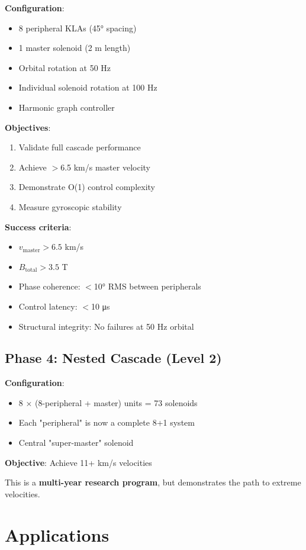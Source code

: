 \documentclass[12pt,a4paper]{article}
\begin{document}
\textbf{Configuration}:
\begin{itemize}
\item 8 peripheral KLAs (45° spacing)
\item 1 master solenoid (2 m length)
\item Orbital rotation at 50 Hz
\item Individual solenoid rotation at 100 Hz
\item Harmonic graph controller
\end{itemize}

\textbf{Objectives}:
\begin{enumerate}
\item Validate full cascade performance
\item Achieve $>$6.5 km/s master velocity
\item Demonstrate O(1) control complexity
\item Measure gyroscopic stability
\end{enumerate}

\textbf{Success criteria}:
\begin{itemize}
\item $v_{\text{master}} > 6.5$ km/s
\item $B_{\text{total}} > 3.5$ T
\item Phase coherence: $<$10° RMS between peripherals
\item Control latency: $<$10 μs
\item Structural integrity: No failures at 50 Hz orbital
\end{itemize}

\subsection{Phase 4: Nested Cascade (Level 2)}

\textbf{Configuration}:
\begin{itemize}
\item 8 × (8-peripheral + master) units = 73 solenoids
\item Each "peripheral" is now a complete 8+1 system
\item Central "super-master" solenoid
\end{itemize}

\textbf{Objective}: Achieve 11+ km/s velocities

This is a \textbf{multi-year research program}, but demonstrates the path to extreme velocities.

\section{Applications}
\end{document}
